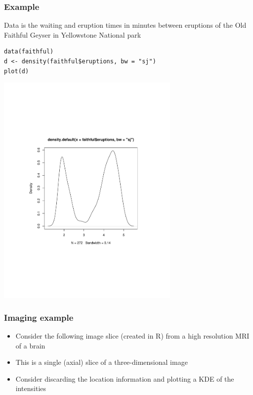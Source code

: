 \documentclass[aspectratio=169]{beamer}
\begin{document}
\begin{frame}[fragile]\frametitle{Example} 
Data is the waiting and eruption times in minutes between
eruptions of the Old Faithful Geyser in Yellowstone National park
\begin{verbatim}
data(faithful)
d <- density(faithful$eruptions, bw = "sj")
plot(d)
\end{verbatim}
\end{frame}

\begin{frame}
\includegraphics[width=3.5in]{kde.pdf}
\end{frame}

\begin{frame}\frametitle{Imaging example}
  \begin{itemize}
  \item Consider the following image slice (created in R) from a high resolution MRI of a brain
  \item This is a single (axial) slice of a three-dimensional image
  \item Consider discarding the location information and plotting a KDE of the intensities
  \end{itemize}
 \end{frame}
\end{document}
